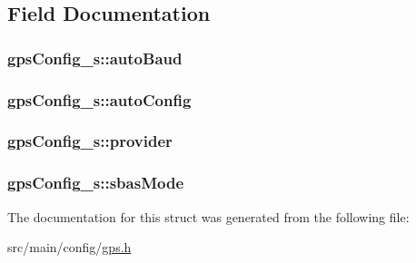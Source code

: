 \subsection{Field Documentation}
\hypertarget{structgpsConfig__s_affa39b9cc980855149e1fe335a7d0ee8}{
\subsubsection[{auto\+Baud}]{ gps\+Config\+\_\+s\+::auto\+Baud}}\label{structgpsConfig__s_affa39b9cc980855149e1fe335a7d0ee8}
\hypertarget{structgpsConfig__s_ad7d6e9caaa525b876126e7b9a4d7e47e}{
\subsubsection[{auto\+Config}]{ gps\+Config\+\_\+s\+::auto\+Config}}\label{structgpsConfig__s_ad7d6e9caaa525b876126e7b9a4d7e47e}
\hypertarget{structgpsConfig__s_a86e16379d860f38c55616b6e8452e208}{
\subsubsection[{provider}]{ gps\+Config\+\_\+s\+::provider}}\label{structgpsConfig__s_a86e16379d860f38c55616b6e8452e208}
\hypertarget{structgpsConfig__s_a9ff23737ff073d47c104ac00960a88f5}{
\subsubsection[{sbas\+Mode}]{ gps\+Config\+\_\+s\+::sbas\+Mode}}\label{structgpsConfig__s_a9ff23737ff073d47c104ac00960a88f5}


The documentation for this struct was generated from the following file\+:\begin{DoxyCompactItemize}
\item 
src/main/config/\hyperlink{config_2gps_8h}{gps.\+h}\end{DoxyCompactItemize}
